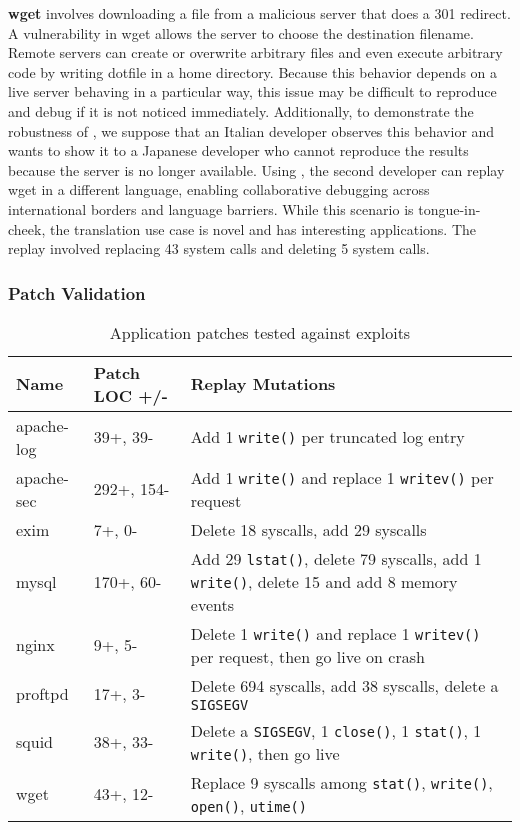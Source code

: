{\bf wget} involves downloading a file from a malicious server
that does a 301 redirect. A vulnerability in wget allows the
server to choose the destination filename.
Remote servers can create or overwrite arbitrary files and even
execute arbitrary code by writing
dotfile in a home directory. Because this behavior depends on a live server
behaving in a particular way, this issue may be difficult to reproduce and debug
if it is not noticed immediately. Additionally, to
demonstrate the robustness of {\dora}, we suppose that an Italian developer
observes this behavior and wants to show it to a Japanese developer
who cannot reproduce the results because
the server is no longer available. Using {\dora}, the second
developer can replay wget in a different language, enabling
collaborative debugging across international borders and language
barriers. While this scenario is tongue-in-cheek,
the translation use case is novel and has interesting
applications. The replay involved replacing 43 system calls and deleting 5
system calls.

\subsubsection{Patch Validation}
\label{sec:validation}

\begin{table*}[t]
\begin{center}
\small
\begin{tabular}{|l|l|l|}   \hline
{\bf Name} & {\bf Patch LOC +/-} & {\bf Replay Mutations} \\
\hline\hline 
		apache-log &
		39+, 39- &
		Add 1 {\tt write()} per truncated log entry \\
\hline
		apache-sec &
		292+, 154- &
		Add 1 {\tt write()} and replace 1 {\tt writev()} per request \\
\hline
		exim &
		7+, 0- &
		Delete 18 syscalls, add 29 syscalls \\
\hline
		mysql &
		170+, 60- &
		Add 29 {\tt lstat()}, delete 79 syscalls, add 1 {\tt write()},
		delete 15 and add 8 memory events \\
\hline
		nginx &
		9+, 5- &
		Delete 1 {\tt write()} and replace 1 {\tt writev()}
                per request, then go live on crash \\
\hline
		proftpd &
                17+, 3- &
		Delete 694 syscalls, add 38 syscalls, delete a {\tt SIGSEGV} \\
\hline
		squid &
		38+, 33- &
		Delete a {\tt SIGSEGV}, 1 {\tt close()}, 1 {\tt stat()}, 1
                {\tt write()}, then go live \\
\hline
		wget &
		43+, 12- &
		Replace 9 syscalls among {\tt stat()}, {\tt write()}, {\tt open()}, {\tt utime()} \\

\hline
\end{tabular}
\end{center}
\renewcommand\thetable{5}
\caption{Application patches tested against exploits}
\label{tab:exploits}
\end{table*}

